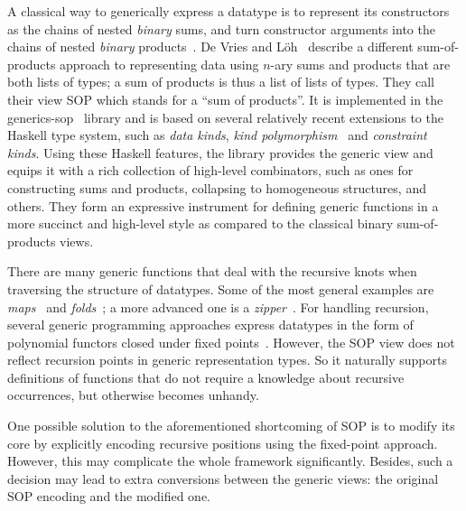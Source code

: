 \documentclass[runningheads]{llncs}
\begin{document}
A classical way to generically express a datatype is to represent its constructors as the chains of nested \emph{binary} sums, and turn constructor arguments into the chains of nested \emph{binary} products~\cite{VanNoort2008,Cheney2002,Loeh2004}\nocite{Rodriguez2008}\nocite{Magalhaes2012}. De Vries and L\"{o}h~\cite{VriLoeh2014} describe a different sum-of-products approach to representing data using $n$-ary sums and products that are both lists of types; a sum of products is thus a list of lists of types. They call their view SOP which stands for a ``sum of products''. It is implemented in the \textsf{generics-sop}~\cite{generics-sop} library and is based on several relatively recent extensions to the Haskell type system, such as \emph{data kinds}, \emph{kind polymorphism}~\cite{Yorgey2012} and \emph{constraint kinds}.
Using these Haskell features, the library provides the generic view and equips it with a rich collection of high-level combinators, such as ones for constructing sums and products, collapsing to homogeneous structures, and others. They form an expressive instrument for defining generic functions in a more succinct and high-level style as compared to the classical binary sum-of-products views.

There are many generic functions that deal with the recursive knots when traversing the structure of datatypes. Some of the most general examples are \emph{maps}~\cite{Magalhaes2010} and \emph{folds}~\cite{Meijer1991}; a more advanced one is a \emph{zipper}~\cite{Huet1997,HiJeLo2004,Adams2010}. For handling recursion, several generic programming approaches express datatypes in the form of polynomial functors closed under fixed points~\cite{MuRec2009,Jansson1997,Loeh2011}. However, the SOP view does not reflect recursion points in generic representation types. So it naturally supports definitions of functions that do not require a knowledge about recursive occurrences, but otherwise becomes unhandy.

One possible solution to the aforementioned shortcoming of SOP is to modify its core by explicitly encoding recursive positions using the fixed-point approach. However, this may complicate the whole framework significantly. Besides, such a decision may lead to extra conversions between the generic views: the original SOP encoding and the modified one.
\end{document}
